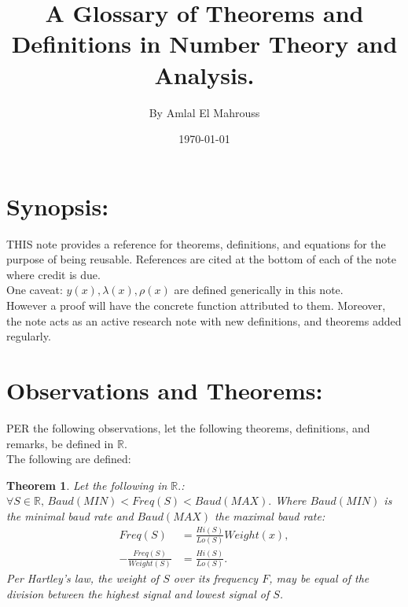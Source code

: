 \documentclass[10pt]{article}
\title{%
	\vspace{-1.5em}%
	\large\textbf{A Glossary of Theorems and Definitions in Number Theory and Analysis.}%
}
\author{By Amlal El Mahrouss}
\date{\today}
\theoremstyle{plain}
\newtheorem{theorem}{Theorem}[section]
\theoremstyle{definition}
\theoremstyle{remark}
\begin{document}

\maketitle
\tableofcontents
\newpage

\section{Synopsis:}

\lettrine[lines=2, lhang=0.1, loversize=0.2]{T}HIS note provides a reference for theorems, definitions, and equations for the purpose of being reusable. References are cited at the bottom of each of the note where credit is due.\\
One caveat: $y(x), \lambda(x), \rho(x)$ are defined generically in this note.\\However a proof will have the concrete function attributed to them. Moreover, the note acts as an active research note with new definitions, and theorems added regularly.

\section{Observations and Theorems:}

\lettrine[lines=1, lhang=0.1, loversize=0.2]{P}ER the following observations, let the following theorems, definitions, and remarks, be defined in $\mathbb{R}.$\\The following are defined:

\begin{theorem}
Let the following in $\mathbb{R}.$:
$\forall S \in \mathbb{R}, \, Baud(MIN) < Freq(S) < Baud(MAX).$ Where $Baud(MIN)$ is the minimal baud rate and $Baud(MAX)$ the maximal baud rate:
\begin{align*}
	Freq(S) &= \frac{Hi(S)}{Lo(S)} Weight(x),\\
	-\frac{Freq(S)}{Weight(S)} &= \frac{Hi(S)}{Lo(S)}.
\end{align*}
Per Hartley's law, the weight of $S$ over its frequency $F$, may be equal of the division between the highest signal and lowest signal of $S$.
\end{theorem}
\end{document}
